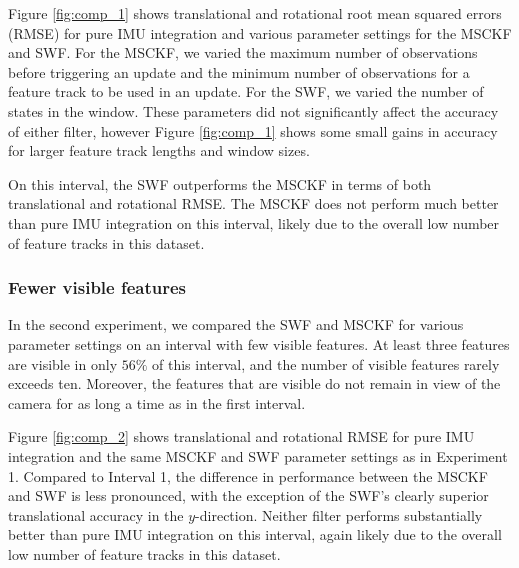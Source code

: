 \documentclass[letterpaper, 10 pt, conference]{ieeeconf}  %
\begin{document}
Figure \ref{fig:comp_1} shows translational and rotational root mean squared errors (RMSE) for pure IMU integration and various parameter settings for the MSCKF and SWF.
For the MSCKF, we varied the maximum number of observations before triggering an update and the minimum number of observations for a feature track to be used in an update.
For the SWF, we varied the number of states in the window.
These parameters did not significantly affect the accuracy of either filter, however Figure \ref{fig:comp_1} shows some small gains in accuracy for larger feature track lengths and window sizes.

On this interval, the SWF outperforms the MSCKF in terms of both translational and rotational RMSE.
The MSCKF does not perform much better than pure IMU integration on this interval, likely due to the overall low number of feature tracks in this dataset.

\subsubsection{Fewer visible features}
In the second experiment, we compared the SWF and MSCKF for various parameter settings on an interval with few visible features.
At least three features are visible in only $56\%$ of this interval, and the number of visible features rarely exceeds ten.
Moreover, the features that are visible do not remain in view of the camera for as long a time as in the first interval.

Figure \ref{fig:comp_2} shows translational and rotational RMSE for pure IMU integration and the same MSCKF and SWF parameter settings as in Experiment 1.
Compared to Interval 1, the difference in performance between the MSCKF and SWF is less pronounced, with the exception of the SWF's clearly superior translational accuracy in the $y$-direction.
Neither filter performs substantially better than pure IMU integration on this interval, again likely due to the overall low number of feature tracks in this dataset.

\end{document}
